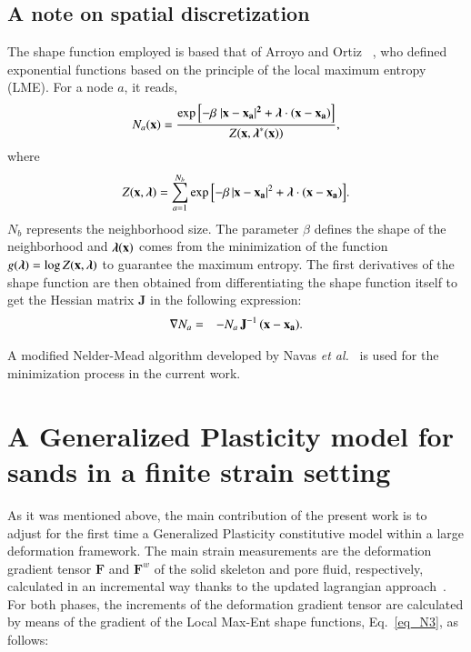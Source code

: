\documentclass[preprint,12pt,a4paper]{elsarticle}
\begin{document}
\subsection{A note on spatial discretization}
\label{subsec:23}
The shape function employed is based that of Arroyo and Ortiz ~\cite{arroyo2006}, who defined exponential  functions based on the principle of  the local maximum entropy (LME).  For a node $a$, it reads,
\begin{equation} \label{eq_N1}
N_a(\textbf{x})=\frac{\exp\left[ -\beta \; |\bf x-x_a|^2 +  \boldsymbol{\lambda}  \cdot  (x-x_a)         \right] } {Z(\textbf{x},\boldsymbol{\lambda}^*(\textbf{x}))},
\end{equation}
where
\begin{equation}\label{eq_N2}
Z({\bf x}, {\boldsymbol{\lambda}}) = \sum_{a=1}^{N_b}{ \exp \left[ -\beta \, |{\bf x-x_a}|^2 + \boldsymbol{\lambda}  \cdot  \bf {(x-x_a)}         \right]}.
\end{equation}
$N_b$ represents the neighborhood size. The parameter $\beta$ defines the shape of the neighborhood and $\boldsymbol{\lambda}(\bf x)$ comes from the minimization of the function $g(\boldsymbol{\lambda})=\log Z(\bf x, \boldsymbol{\lambda})$ to guarantee the maximum entropy. The first derivatives of the shape function are then obtained from differentiating the shape function itself to get the Hessian matrix \textbf{J}  in the following expression:
\begin{eqnarray}
\nabla N_a &=& -N_a \,  \textbf{J}^{-1} \,  (\bf x-x_a) \label{eq_N3}.
\end{eqnarray}

A modified Nelder-Mead algorithm developed by Navas {\it et al.}~\cite{Navas2018} is used for the minimization process in the current work.
 
\section{A Generalized Plasticity model for sands in a finite strain setting  
}
\label{sec:3}
As it was mentioned above, the main contribution of the present work is to adjust for the first time a Generalized Plasticity constitutive model within a large deformation framework. The main strain measurements are the deformation gradient tensor $\mathbf{F}$ and $\mathbf{F}^w$ of the solid skeleton and pore fluid, respectively, calculated in an incremental way thanks to the updated lagrangian approach~\cite{Bonet2008}. For both phases, the increments of the deformation gradient tensor are calculated by means of the gradient of the Local Max-Ent shape functions, Eq.~\eqref{eq_N3}, as follows:
\end{document}

